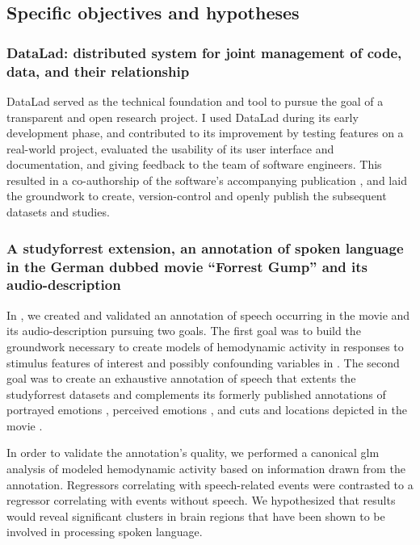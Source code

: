 \subsection{Specific objectives and hypotheses}




\subsubsection{DataLad: distributed system for joint management of code, data,
and their relationship}

%
DataLad served as the technical foundation and tool to pursue the goal of a
transparent and open research project.
%
I used DataLad during its early development phase, and contributed to its
improvement by testing features on a real-world project, evaluated the usability
of its user interface and documentation, and giving feedback to the team of
software engineers.
%
This resulted in a co-authorship of the software's accompanying publication
\citep[cf.][]{halchenko2021datalad}, and laid the groundwork to create,
version-control and openly publish the subsequent datasets and studies.


\subsubsection{A studyforrest extension, an annotation of spoken language in the
German dubbed movie ``Forrest Gump'' and its audio-description}

In \citet{haeusler2021speechanno}, we created and validated an annotation of
speech occurring in the movie and its audio-description pursuing two goals.
The first goal was to build the groundwork necessary to create models of
hemodynamic activity in responses to stimulus features of interest and possibly
confounding variables in \citet{haeusler2022processing}.
The second goal was to create an exhaustive annotation of speech that extents
the studyforrest datasets and complements its formerly published annotations of
portrayed emotions \citep{labs2015portrayed}, perceived emotions
\citep{lettieri2019emotionotopy}, and cuts and locations depicted in the movie
\citep{haeusler2016cutanno}.

In order to validate the annotation's quality, we performed a canonical \ac{glm}
analysis of modeled hemodynamic activity based on information drawn from the
annotation.
Regressors correlating with speech-related events were contrasted to a regressor
correlating with events without speech.
We hypothesized that results would reveal significant clusters in brain regions
that have been shown to be involved in processing spoken language.


